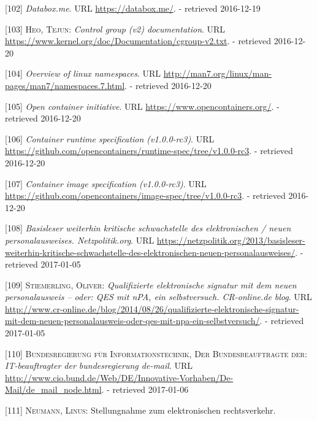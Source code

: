 \documentclass[12pt,english,a4paper,titlepage,cleardoublepage=empty,dottedtoc]{report}
\begin{document}
\hypertarget{ref-web_2016_demo_databox}{}
{[}102{]} \emph{Databox.me}. URL \url{https://databox.me/}. - retrieved
2016-12-19

\hypertarget{ref-web_2015_cgroup-doc}{}
{[}103{]} \textsc{Heo, Tejun}: \emph{Control group (v2) documentation}.
URL \url{https://www.kernel.org/doc/Documentation/cgroup-v2.txt}. -
retrieved 2016-12-20

\hypertarget{ref-web_2016_kernel-namespace}{}
{[}104{]} \emph{Overview of linux namespaces}. URL
\url{http://man7.org/linux/man-pages/man7/namespaces.7.html}. -
retrieved 2016-12-20

\hypertarget{ref-web_2016_open-container-initiative}{}
{[}105{]} \emph{Open container initiative}. URL
\url{https://www.opencontainers.org/}. - retrieved 2016-12-20

\hypertarget{ref-web_oci-spec_runtime}{}
{[}106{]} \emph{Container runtime specification (v1.0.0-rc3)}. URL
\url{https://github.com/opencontainers/runtime-spec/tree/v1.0.0-rc3}. -
retrieved 2016-12-20

\hypertarget{ref-web_oci-spec_image}{}
{[}107{]} \emph{Container image specification (v1.0.0-rc3)}. URL
\url{https://github.com/opencontainers/image-spec/tree/v1.0.0-rc3}. -
retrieved 2016-12-20

\hypertarget{ref-web_2013_npa-sicherheitsdefizit}{}
{[}108{]} \emph{Basisleser weiterhin kritische schwachstelle des
elektronischen / neuen personalausweises. Netzpolitik.org}. URL
\url{https://netzpolitik.org/2013/basisleser-weiterhin-kritische-schwachstelle-des-elektronischen-neuen-personalausweises/}.
- retrieved 2017-01-05

\hypertarget{ref-web_2014_test-qes-support-in-npa}{}
{[}109{]} \textsc{Stiemerling, Oliver}: \emph{Qualifizierte
elektronische signatur mit dem neuen personalausweis -- oder: QES mit
nPA, ein selbstversuch. CR-online.de blog}. URL
\url{http://www.cr-online.de/blog/2014/08/26/qualifizierte-elektronische-signatur-mit-dem-neuen-personalausweis-oder-qes-mit-npa-ein-selbstversuch/}.
- retrieved 2017-01-05

\hypertarget{ref-web_2017_about-de-mail}{}
{[}110{]} \textsc{Bundesregierung für Informationstechnik, Der
Bundesbeauftragte der}: \emph{IT-beauftragter der bundesregierung
de-mail}. URL
\url{http://www.cio.bund.de/Web/DE/Innovative-Vorhaben/De-Mail/de_mail_node.html}.
- retrieved 2017-01-06

\hypertarget{ref-statement_2013_de-mail}{}
{[}111{]} \textsc{Neumann, Linus}: Stellungnahme zum elektronischen
rechtsverkehr.
\end{document}
